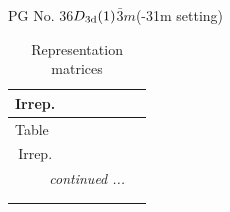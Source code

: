 \documentclass[fleqn,8pt,landscape]{jsarticle}
\begin{document}
\setcounter{MaxMatrixCols}{32}

\renewcommand{\tablename}{Table~}
\renewcommand{\figurename}{Figure~}
\begin{center}
\LARGE
PG No. 36\quad$D_{\rm 3d}(1)$\quad$\bar{3}m$\quad(-31m setting)\quad[ trigonal ]
\end{center}
\renewcommand{\arraystretch}{1.2}
\begin{longtable}{ccccccc}
\caption{Representation matrices}
 \\
 \hline \hline
Irrep. &  &  &  &  &  &  \\ \hline \endfirsthead

\multicolumn{6}{l}{\tablename\ \thetable{}} \\
 \hline \hline
Irrep. &  &  &  &  &  &  \\ \hline \endhead

 \hline \hline
\multicolumn{6}{r}{\footnotesize\it continued ...} \\ \endfoot

 \hline \hline
\multicolumn{6}{r}{} \\ \endlastfoot


\end{longtable}
\end{document}
